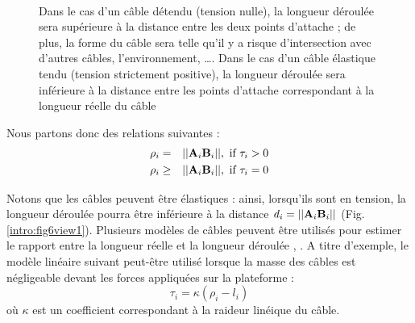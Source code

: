 \begin{figure}[!ht]
  \centering
       \hfill
     \\
    \caption{\footnotesize{Dans le cas d'un câble détendu (tension nulle), la longueur déroulée sera supérieure à la distance entre les deux points d'attache ; de plus, la forme du câble sera telle qu'il y a risque d'intersection avec d'autres câbles, l'environnement, \dots. Dans le cas d'un câble élastique tendu (tension strictement positive), la longueur déroulée sera inférieure à la distance entre les points d'attache correspondant à la longueur réelle du câble}}
\label{intro:fig6}
\end{figure}

Nous partons donc des relations suivantes :
\begin{eqnarray}
\rho_i &=& ||{\bf A}_i {\bf B}_i||, \hbox{ if } \tau_i > 0 \\ 
\rho_i &\geq& ||{\bf A}_i {\bf B}_i||, \hbox{ if } \tau_i = 0
\label{intro:eq1}
\end{eqnarray}

Notons que les câbles peuvent être élastiques : ainsi, lorsqu'ils sont en tension, la longueur déroulée pourra être inférieure à la distance $d_i = ||{\bf A}_i {\bf B}_i||$ (Fig.\ref{intro:fig6view1}). Plusieurs modèles de câbles peuvent être utilisés pour estimer le rapport entre la longueur réelle et la longueur déroulée \cite{1974IrvineCaughey}, \cite{2006:Kozak.ea}. A titre d'exemple, le modèle linéaire suivant peut-être utilisé lorsque la masse des câbles est négligeable devant les forces appliquées sur la plateforme :
$$\tau_i = \kappa(\rho_i - l_i)$$
où $\kappa$ est un coefficient correspondant à la raideur linéique du câble.

